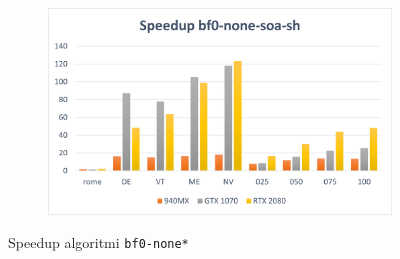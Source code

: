 \documentclass[12pt,a4paper]{book} %
\begin{document}
\begin{figure}[b]
\begin{subfigure}{.5\textwidth}
		\end{subfigure}%
		\begin{subfigure}{.5\textwidth}
			\centering
			\includegraphics[width=\textwidth]{speedup_bf0-none-soa-sh}
		\end{subfigure}
		\caption{Speedup algoritmi \texttt{bf0-none*}}
		\label{fig:speedup_bf0-none}
	\end{figure}
\end{document}
